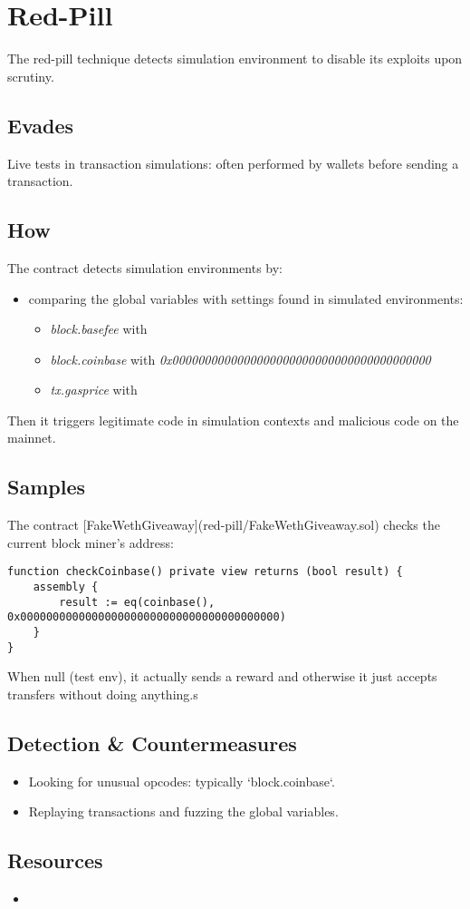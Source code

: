 \section{Red-Pill}

The red-pill technique detects simulation environment to disable its exploits upon scrutiny. 

\subsection{Evades}

Live tests in transaction simulations: often performed by wallets before sending a transaction.

\subsection{How}

The contract detects simulation environments by:

\begin{itemize}
\item{comparing the global variables with settings found in simulated environments:
\begin{itemize}
    \item{\emph{block.basefee} with}
    \item{\emph{block.coinbase} with \emph{0x0000000000000000000000000000000000000000}}
    \item{\emph{tx.gasprice} with}
\end{itemize}}
\end{itemize}

Then it triggers legitimate code in simulation contexts and malicious code on the mainnet.

\subsection{Samples}

The contract [FakeWethGiveaway](red-pill/FakeWethGiveaway.sol) checks the current block miner’s address:

\begin{lstlisting}[language=Solidity]
function checkCoinbase() private view returns (bool result) {
    assembly {
        result := eq(coinbase(), 0x0000000000000000000000000000000000000000)
    }
}
\end{lstlisting}

When null (test env), it actually sends a reward and otherwise it just accepts transfers without doing anything.s

\subsection{Detection \& Countermeasures}

\begin{itemize}
\item{Looking for unusual opcodes: typically `block.coinbase`.}
\item{Replaying transactions and fuzzing the global variables.}
\end{itemize}

\subsection{Resources}

\begin{itemize}
\item{\cite{article-red-pill}}
\end{itemize}
